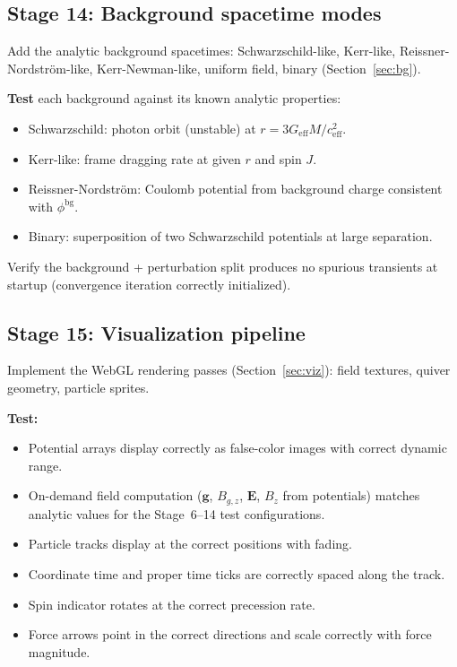 \documentclass[11pt,a4paper]{article}
\newcommand{\vv}[1]{\mathbf{#1}}
\begin{document}
\subsection{Stage 14: Background spacetime modes}

Add the analytic background spacetimes: Schwarzschild-like, Kerr-like, Reissner-Nordström-like, Kerr-Newman-like, uniform field, binary (Section~\ref{sec:bg}).

\textbf{Test} each background against its known analytic properties:
\begin{itemize}
  \item Schwarzschild: photon orbit (unstable) at $r = 3G_{\mathrm{eff}}M/c_{\mathrm{eff}}^2$.
  \item Kerr-like: frame dragging rate at given $r$ and spin $J$.
  \item Reissner-Nordström: Coulomb potential from background charge consistent with $\phi^{\mathrm{bg}}$.
  \item Binary: superposition of two Schwarzschild potentials at large separation.
\end{itemize}
Verify the background + perturbation split produces no spurious transients at startup (convergence iteration correctly initialized).

\subsection{Stage 15: Visualization pipeline}

Implement the WebGL rendering passes (Section~\ref{sec:viz}): field textures, quiver geometry, particle sprites.

\textbf{Test:}
\begin{itemize}
  \item Potential arrays display correctly as false-color images with correct dynamic range.
  \item On-demand field computation ($\vv{g}$, $B_{g,z}$, $\vv{E}$, $B_z$ from potentials) matches analytic values for the Stage~6--14 test configurations.
  \item Particle tracks display at the correct positions with fading.
  \item Coordinate time and proper time ticks are correctly spaced along the track.
  \item Spin indicator rotates at the correct precession rate.
  \item Force arrows point in the correct directions and scale correctly with force magnitude.
\end{itemize}
\end{document}
